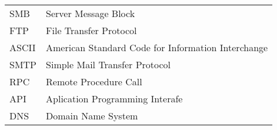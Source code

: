 
\seznamzkr

\begin{tabular}{ll}
	SMB		& Server Message Block\\	
	FTP		& File Transfer Protocol\\
	ASCII	& American Standard Code for Information Interchange\\
	SMTP		& Simple Mail Transfer Protocol\\
	RPC		& Remote Procedure Call\\
	API 		& Aplication Programming Interafe\\
	DNS		& Domain Name System \\

\end{tabular}

